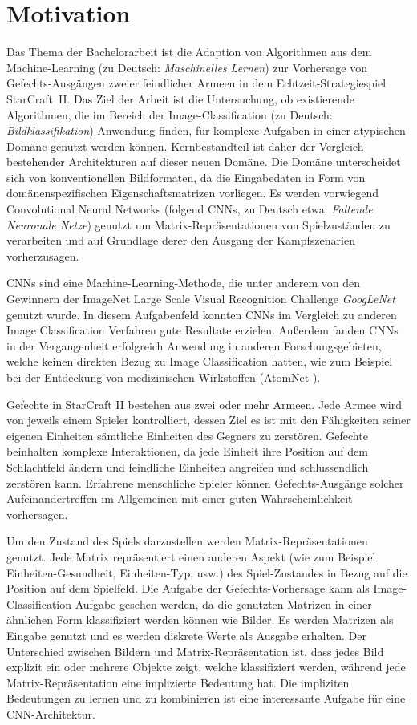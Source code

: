 \section{Motivation}

Das Thema der Bachelorarbeit ist die Adaption von Algorithmen aus dem Machine-Learning (zu Deutsch: \textit{Maschinelles Lernen}) zur Vorhersage von Gefechts-Ausgängen zweier feindlicher Armeen in dem Echtzeit-Strategiespiel StarCraft~II. Das Ziel der Arbeit ist die Untersuchung, ob existierende Algorithmen, die im Bereich der Image-Classification (zu Deutsch: \textit{Bildklassifikation}) Anwendung finden, für komplexe Aufgaben in einer atypischen Domäne genutzt werden können. Kernbestandteil ist daher der Vergleich bestehender Architekturen auf dieser neuen Domäne. Die Domäne unterscheidet sich von konventionellen Bildformaten, da die Eingabedaten in Form von domänenspezifischen Eigenschaftsmatrizen vorliegen. Es werden vorwiegend Convolutional Neural Networks (folgend CNNs, zu Deutsch etwa: \textit{Faltende Neuronale Netze}) genutzt um Matrix-Repräsentationen von Spielzuständen zu verarbeiten und auf Grundlage derer den Ausgang der Kampfszenarien vorherzusagen. 

CNNs sind eine Machine-Learning-Methode, die unter anderem von den Gewinnern der ImageNet Large Scale Visual Recognition Challenge \textit{GoogLeNet} \parencite{DBLP:journals/corr/SzegedyLJSRAEVR14} genutzt wurde. In diesem Aufgabenfeld konnten CNNs im Vergleich zu anderen Image Classification Verfahren gute Resultate erzielen. Außerdem fanden CNNs in der Vergangenheit erfolgreich Anwendung in anderen Forschungsgebieten, welche keinen direkten Bezug zu Image Classification hatten, wie zum Beispiel bei der Entdeckung von medizinischen Wirkstoffen (AtomNet \parencite{DBLP:journals/corr/WallachDH15}).

Gefechte in StarCraft II bestehen aus zwei oder mehr Armeen. Jede Armee wird von jeweils einem Spieler kontrolliert, dessen Ziel es ist mit den Fähigkeiten seiner eigenen Einheiten sämtliche Einheiten des Gegners zu zerstören. Gefechte beinhalten komplexe Interaktionen, da jede Einheit ihre Position auf dem Schlachtfeld ändern und feindliche Einheiten angreifen und schlussendlich zerstören kann. Erfahrene menschliche Spieler können Gefechts-Ausgänge solcher Aufeinandertreffen im Allgemeinen mit einer guten Wahrscheinlichkeit vorhersagen.

Um den Zustand des Spiels darzustellen werden Matrix-Repräsentationen genutzt. Jede Matrix repräsentiert einen anderen Aspekt (wie zum Beispiel Einheiten-Gesundheit, Einheiten-Typ, usw.) des Spiel-Zustandes in Bezug auf die Position auf dem Spielfeld. Die Aufgabe der Gefechts-Vorhersage kann als Image-Classification-Aufgabe gesehen werden, da die genutzten Matrizen in einer ähnlichen Form klassifiziert werden können wie Bilder. Es werden Matrizen als Eingabe genutzt und es werden diskrete Werte als Ausgabe erhalten. Der Unterschied zwischen Bildern und Matrix-Repräsentation ist, dass jedes Bild explizit ein  oder mehrere Objekte zeigt, welche klassifiziert werden, während jede Matrix-Repräsentation eine implizierte Bedeutung hat. Die impliziten Bedeutungen zu lernen und zu kombinieren ist eine interessante Aufgabe für eine CNN-Architektur.

